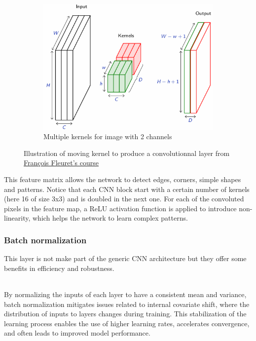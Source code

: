 \documentclass[twocolumn,superscriptaddress,aps]{revtex4-1}
\begin{document}
\begin{figure}[H]
\begin{subfigure}[t]{.3\textwidth}
        \includegraphics[width =\textwidth]{images/kernel_move3.png}
        \caption{Multiple kernels for image with 2 channels}
        \label{fig:kernel_mov3}
        \end{subfigure}
    \caption{Illustration of moving kernel to produce a convolutionnal layer from \href{https://fleuret.org/dlc/materials/dlc-slides-4-4-convolutions.pdf}{François Fleuret's course}}
    \label{fig:1.2}
\end{figure}

This feature matrix allows the network to detect edges, corners, simple shapes and patterns. Notice that each CNN block start with a certain number of kernels (here 16 of size 3x3) and is doubled in the next one. For each of the convoluted pixels in the feature map, a ReLU activation function is applied to introduce non-linearity, which helps the network to learn complex patterns. 

\subsubsection{Batch normalization}

This layer is not make part of the generic CNN architecture but they offer some benefits in efficiency and robustness.

\\

By normalizing the inputs of each layer to have a consistent mean and variance, batch normalization mitigates issues related to internal covariate shift, where the distribution of inputs to layers changes during training. This stabilization of the learning process enables the use of higher learning rates, accelerates convergence, and often leads to improved model performance.
\end{document}
